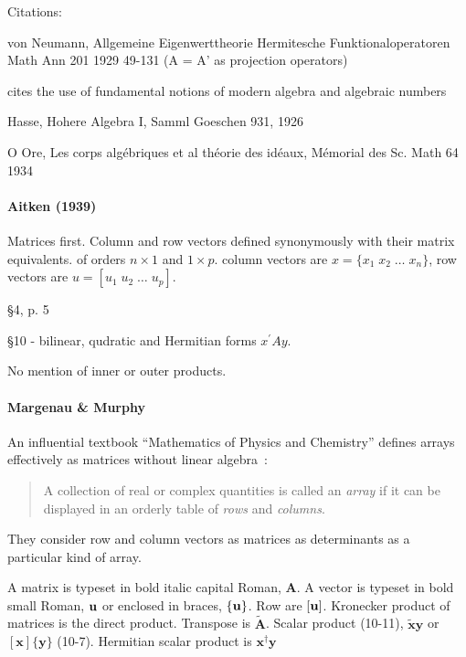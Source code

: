 Citations:

von Neumann, Allgemeine Eigenwerttheorie Hermitesche Funktionaloperatoren
Math Ann 201 1929 49-131 (A = A' as projection operators)

cites the use of fundamental notions of modern algebra and algebraic numbers

Hasse, Hohere Algebra I, Samml  Goeschen 931, 1926

O Ore, Les corps algébriques et al théorie des idéaux, Mémorial des Sc. Math 64 1934


\paragraph{Aitken (1939)~\cite{Aitken1939}}

Matrices first. Column and row vectors defined synonymously with their matrix equivalents.
of orders $n\times1$ and $1\times p$.
column vectors are $x = \{x_1\;x_2\;\dots\;x_n\}$,
row vectors are $u = [u_1\;u_2\;\dots\;u_p]$.

\S 4, p. 5

\S 10 - bilinear, qudratic and Hermitian forms $x^\prime A y$.

No mention of inner or outer products.


\paragraph{Margenau \& Murphy~\cite{Margenau1943}}

An influential textbook ``Mathematics of Physics and Chemistry'' defines arrays
effectively as matrices without linear algebra~\cite[\S 10.1, p. 288]{Margenau1943}:

\begin{quote}
A collection of real or complex quantities is called an
\textit{array} if it can be displayed in an orderly table of \textit{rows} and \textit{columns}.
\end{quote}

They consider row and column vectors as matrices as determinants as a particular kind of array.

A matrix is typeset in bold italic capital Roman, $\boldsymbol A$.
A vector is typeset in bold small Roman, $\textbf u$ or enclosed in braces, $\{ \textbf u \}$.
Row are $[\textbf u ]$.
Kronecker product of matrices is the direct product.
Transpose is $\tilde{\boldsymbol A}$.
Scalar product (10-11), $\tilde{\mathbf x} \mathbf y$ or $[\mathbf x] \{\mathbf y\}$ (10-7).
Hermitian scalar product is $\mathbf x^\dagger \mathbf y$



